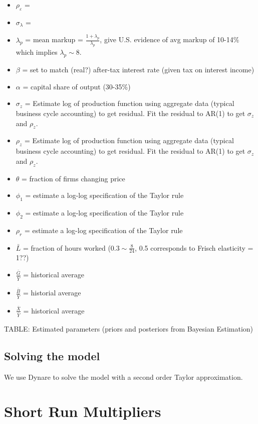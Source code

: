 \documentclass[article,11pt,letterpaper,fleqn]{article}
\theoremstyle{definition}
\numberwithin{equation}{section}
\newcommand{\cn}{\citeasnoun} %
\newcommand\ve{\varepsilon}
\begin{document}
\begin{itemize}
\item $\rho_{\ve}$ = 
\item $\sigma_{\lambda}$ =
\item $\lambda_{p}$ = mean markup = $\frac{1+\lambda_{p}}{\lambda_{p}}$, \cn{BF1995} give U.S. evidence of avg markup of 10-14\% which implies $\lambda_{p}\sim 8$.
\item $\beta$ = set to match (real?) after-tax interest rate (given tax on interest income)
\item $\alpha$ = capital share of output (30-35\%)
\item $\sigma_{z}$ = Estimate log of production function using aggregate data (typical business cycle accounting) to get residual.  Fit the residual to AR(1) to get $\sigma_{z}$ and $\rho_{z}$.
\item $\rho_{z}$ = Estimate log of production function using aggregate data (typical business cycle accounting) to get residual.  Fit the residual to AR(1) to get $\sigma_{z}$ and $\rho_{z}$.
\item $\theta$ = fraction of firms changing price
\item $\phi_{1}$ = estimate a log-log specification of the Taylor rule
\item $\phi_{2}$ = estimate a log-log specification of the Taylor rule
\item $\rho_{r}$ = estimate a log-log specification of the Taylor rule
\item $\bar{L}$ = fraction of hours worked ($0.3 \sim \frac{8}{24}$, 0.5 corresponds to Frisch elasticity = 1??)
\item $\frac{\bar{G}}{\bar{Y}}$ = historical average
\item $\frac{\bar{B}}{\bar{Y}}$ = historial average
\item $\frac{\bar{X}}{\bar{Y}}$ = historical average
\end{itemize}

TABLE: Estimated parameters (priors and posteriors from Bayesian Estimation)


\subsection{Solving the model}

We use Dynare to solve the model with a second order Taylor approximation.

\section{Short Run Multipliers}
\end{document}
